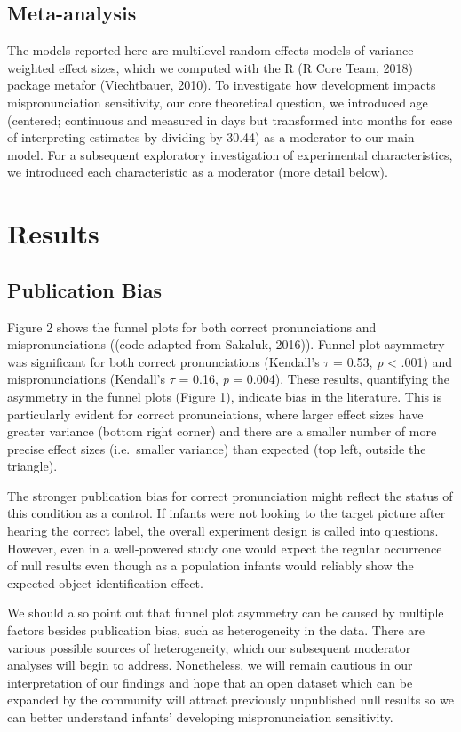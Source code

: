\documentclass[man]{apa6}
\theoremstyle{definition}
\theoremstyle{definition}
\theoremstyle{definition}
\theoremstyle{remark}
\begin{document}
\subsection{Meta-analysis}\label{meta-analysis}

The models reported here are multilevel random-effects models of
variance-weighted effect sizes, which we computed with the R (R Core
Team, 2018) package metafor (Viechtbauer, 2010). To investigate how
development impacts mispronunciation sensitivity, our core theoretical
question, we introduced age (centered; continuous and measured in days
but transformed into months for ease of interpreting estimates by
dividing by 30.44) as a moderator to our main model. For a subsequent
exploratory investigation of experimental characteristics, we introduced
each characteristic as a moderator (more detail below).

\section{Results}\label{results}

\subsection{Publication Bias}\label{publication-bias-1}

Figure 2 shows the funnel plots for both correct pronunciations and
mispronunciations ((code adapted from Sakaluk, 2016)). Funnel plot
asymmetry was significant for both correct pronunciations (Kendall's
\(\tau\) = 0.53, \emph{p} \textless{} .001) and mispronunciations
(Kendall's \(\tau\) = 0.16, \emph{p} = 0.004). These results,
quantifying the asymmetry in the funnel plots (Figure 1), indicate bias
in the literature. This is particularly evident for correct
pronunciations, where larger effect sizes have greater variance (bottom
right corner) and there are a smaller number of more precise effect
sizes (i.e.~smaller variance) than expected (top left, outside the
triangle).

The stronger publication bias for correct pronunciation might reflect
the status of this condition as a control. If infants were not looking
to the target picture after hearing the correct label, the overall
experiment design is called into questions. However, even in a
well-powered study one would expect the regular occurrence of null
results even though as a population infants would reliably show the
expected object identification effect.

We should also point out that funnel plot asymmetry can be caused by
multiple factors besides publication bias, such as heterogeneity in the
data. There are various possible sources of heterogeneity, which our
subsequent moderator analyses will begin to address. Nonetheless, we
will remain cautious in our interpretation of our findings and hope that
an open dataset which can be expanded by the community will attract
previously unpublished null results so we can better understand infants'
developing mispronunciation sensitivity.
\end{document}
